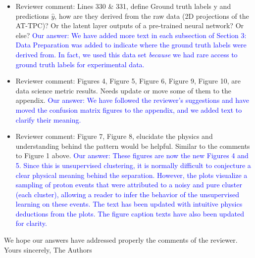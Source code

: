 \documentclass[12pt]{article}
\begin{document}
\begin{itemize}
\item Reviewer comment: Lines 330 \& 331, define Ground truth labels y and predictions $\hat{y}$, how are they derived from
the raw data (2D projections of the AT-TPC)? Or the latent layer outputs of a pre-trained neural
network? Or else?
\textcolor{blue}{Our answer: We have added more text in each subsection of Section 3: Data Preparation was added to indicate where the ground truth labels were derived from. In fact, we used this data set {\it because} we had rare access to ground truth labels for experimental data.}
\item Reviewer comment: Figures 4, Figure 5, Figure 6, Figure 9, Figure 10, are data science metric results. Needs update or
move some of them to the appendix.
\textcolor{blue}{Our answer: We have followed the reviewer's suggestions and have moved the confusion matrix figures to the appendix, and we added text to clarify their meaning.}
\item Reviewer comment: Figure 7, Figure 8, elucidate the physics and understanding behind the pattern would be helpful.
Similar to the comments to Figure 1 above.
\textcolor{blue}{Our answer: These figures are now the new Figures 4 and 5. Since this is unsupervised clustering, it is normally difficult to conjecture a clear physical meaning behind the separation. However, the plots visualize a sampling of proton events that were attributed to a noisy and pure cluster (each cluster), allowing a reader to infer the behavior of the unsupervised learning on these events. The text has been updated with intuitive physics deductions from the plots. The figure caption texts have also been updated for clarity. }
\end{itemize}

We hope our answers have addressed properly the comments of the reviewer. \newline
Yours sincerely,\newline
The Authors
\end{document}
